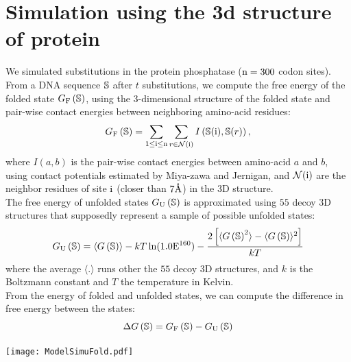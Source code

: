 \section{Simulation using the 3d structure of protein}
We simulated \glspl{substitution} in the protein phosphatase ($\text{n}=300$ \gls{codon} sites).
From a \acrshort{DNA} sequence $\mathbb{S}$ after $t$ \glspl{substitution}, we compute the free energy of the folded state $G_{\mathrm{F}}\left(\mathbb{S}\right)$, using the $3$-dimensional structure of the folded state and pair-wise contact energies between neighboring amino-acid residues:
\begin{equation}
G_{\mathrm{F}}\left(\mathbb{S}\right) = \sum\limits_{1 \leq \text{i} \leq \text{n}} \sum\limits_{r \in \mathcal{N}(\text{i})} I \left(\mathbb{S}(\text{i}), \mathbb{S}(r) \right),
\end{equation}
where $I(a,b)$ is the pair-wise contact energies between amino-acid $a$ and $b$, using contact potentials estimated by Miya-zawa and Jernigan, and $\mathcal{N}(\text{i})$ are the neighbor residues of site $\text{i}$ (closer than $7\text{\normalfont\AA}$) in the $3$D structure.\\
The free energy of unfolded states $G_{\mathrm{U}}\left(\mathbb{S}\right)$ is approximated using $55$ decoy $3$D structures that supposedly represent a sample of possible unfolded states:
\begin{equation}
G_{\mathrm{U}}\left(\mathbb{S}\right) = \langle G\left(\mathbb{S}\right) \rangle - kT \ln (1.0\mathrm{E}^{160}) - \frac{2 \left[ \langle G\left(\mathbb{S}\right)^2 \rangle - \langle G\left(\mathbb{S}\right) \rangle^2\right] }{kT}
\end{equation}
where the average $\langle . \rangle$ runs other the $55$ decoy $3$D structures, and $k$ is the Boltzmann constant and $T$ the temperature in Kelvin.\\
From the energy of folded and unfolded states, we can compute the difference in free energy between the states:
\begin{equation}
\Delta G\left(\mathbb{S}\right) = G_{\mathrm{F}}\left(\mathbb{S}\right) - G_{\mathrm{U}}\left(\mathbb{S}\right)
\end{equation}
\begin{center}
 \texttt{[image: ModelSimuFold.pdf]}
\end{center}

